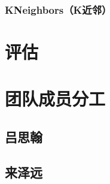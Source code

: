 \documentclass[fontset=windows]{article}
\begin{document}
\subsubsection{KNeighbors（K近邻）}







\section{评估}

\section{团队成员分工}

\subsection{吕思翰}

\subsection{来泽远}
\end{document}
